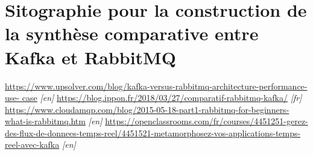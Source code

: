 \documentclass[11pt]{article}
\begin{document}
\section{Sitographie pour la construction de la synthèse comparative entre Kafka et RabbitMQ}\label{ann:kafkarabbitmq}
	\hspace*{-0.5cm}\href{https://www.upsolver.com/blog/kafka-versus-rabbitmq-architecture-performance-use-
	case}{https://www.upsolver.com/blog/kafka-versus-rabbitmq-architecture-performance-use-
	case} \textit{[en]} \medskip\newline
	\href{https://blog.ippon.fr/2018/03/27/comparatif-rabbitmq-kafka/}{https://blog.ippon.fr/2018/03/27/comparatif-rabbitmq-kafka/} \textit{[fr]}\medskip\newline
	\href{https://www.cloudamqp.com/blog/2015-05-18-part1-rabbitmq-for-beginners-what-is-rabbitmq.htm}{https://www.cloudamqp.com/blog/2015-05-18-part1-rabbitmq-for-beginners-what-is-rabbitmq.htm} \textit{[en]}\medskip\newline
	\href{https://openclassrooms.com/fr/courses/4451251-gerez-des-flux-de-donnees-temps-reel/4451521-metamorphosez-vos-applications-temps-reel-avec-kafka}{https://openclassrooms.com/fr/courses/4451251-gerez-des-flux-de-donnees-temps-reel/4451521-metamorphosez-vos-applications-temps-reel-avec-kafka} \textit{[en]}

\newpage
\end{document}
